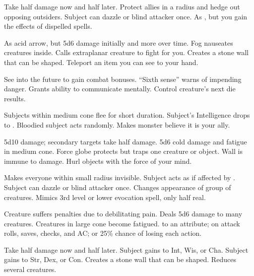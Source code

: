 \begin{swspelllist}
   Take half damage now and half later. 
   Protect allies in a \areamed radius and hedge out opposing outsiders.
   Subject can dazzle or blind attacker once.
   As , but you gain the effects of dispelled spells.

   As acid arrow, but 5d6 damage initially and more over time.
   Fog nauseates creatures inside.
   Calls extraplanar creature to fight for you.
   Creates a stone wall that can be shaped.
   Teleport an item you can see to your hand.

   See into the future to gain combat bonuses.
   ``Sixth sense'' warns of impending danger.
   Grants ability to communicate mentally. 
   Control creature's next die results.

   Subjects within medium cone flee for short duration.
   Subject's Intelligence drops to .
   Bloodied subject acts randomly.
   Makes monster believe it is your ally.

   5d10 damage; secondary targets take half damage.
   5d6 cold damage and fatigue in medium cone.
   Force globe protects but traps one creature or object.
   Wall is immune to damage.
   Hurl objects with the force of your mind.

   Makes everyone within small radius invisible.
   Subject acts as if affected by .
   Subject can dazzle or blind attacker once.
   Changes appearance of group of creatures.
   Mimics 3rd level or lower evocation spell, only half real.

   Creature suffers penalties due to debilitating pain.
   Deals 5d6 damage to many creatures.
   Creatures in large cone become fatigued.
    to an attribute;  on attack rolls, saves, checks, and AC; or 25\% chance of losing each action.

   Take half damage now and half later. 
   Subject gains  to Int, Wis, or Cha.
   Subject gains  to Str, Dex, or Con.
   Creates a stone wall that can be shaped.
   Reduces several creatures.
\end{swspelllist}
